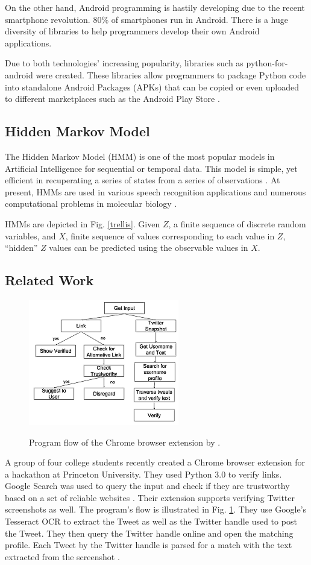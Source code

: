 \documentclass[journal]{./IEEEtran}
\begin{document}
	On the other hand, Android programming is hastily developing due to the recent smartphone revolution. 80\% of smartphones run in Android. There is a huge diversity of libraries to help programmers develop their own Android applications. 
	
	Due to both technologies' increasing popularity, libraries such as python-for-android were created. These libraries allow programmers to package Python code into standalone Android Packages (APKs) that can be copied or even uploaded to different marketplaces such as the Android Play Store \cite{kivy16}.
		
	\subsection{Hidden Markov Model}	
	The Hidden Markov Model (HMM) is one of the most popular models in Artificial Intelligence for sequential or temporal data. This model is simple, yet efficient in recuperating a series of states from a series of observations \cite{ramage13}. At present, HMMs are used in various speech recognition applications and numerous computational problems in molecular biology \cite{Ghahramani01}.
	
	HMMs are depicted in Fig. \ref{trellis}. Given $Z$, a finite sequence of discrete random variables, and $X$, finite sequence of values corresponding to each value in $Z$, ``hidden'' $Z$ values can be predicted using the observable values in $X$.
	
	\subsection{Related Work}
	
	\begin{figure}
		\includegraphics{related}
		\label{related}
		\caption{Program flow of the Chrome browser extension by \cite{goel16}.}
	\end{figure}
	
	A group of four college students recently created a Chrome browser extension for a hackathon at Princeton University. They used Python 3.0 to verify links. Google Search was used to query the input and check if they are trustworthy based on a set of reliable websites \cite{goel16}. Their extension supports verifying Twitter screenshots as well. The program's flow is illustrated in Fig. \ref{related}. They use Google’s Tesseract OCR to extract the Tweet as well as the Twitter handle used to post the Tweet. They then query the Twitter handle online and open the matching profile. Each Tweet by the Twitter handle is parsed for a match with the text extracted from the screenshot \cite{bort16}. 
	
\end{document}
